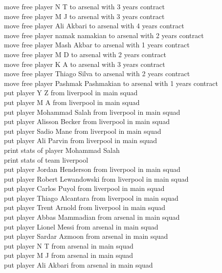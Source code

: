 \documentclass[]{article}
\begin{document}
{move free player N T to arsenal with 3 years contract\\
move free player M J to arsenal with 3 years contract\\
move free player Ali Akbari to arsenal with 4 years contract\\
move free player namak namakian to arsenal with 2 years contract\\
move free player Mash Akbar to arsenal with 1 years contract\\
move free player M D to arsenal with 2 years contract\\
move free player K A to arsenal with 3 years contract\\
move free player Thiago Silva to arsenal with 2 years contract\\
move free player Pashmak Pashmakian to arsenal with 1 years contract\\
put player Y Z from liverpool in main squad\\
put player M A from liverpool in main squad\\
put player Mohammad Salah from liverpool in main squad\\
put player Alisson Becker from liverpool in main squad\\
put player Sadio Mane from liverpool in main squad\\
put player Ali Parvin from liverpool in main squad\\
print stats of player Mohammad Salah\\
print stats of team liverpool\\
put player Jordan Henderson from liverpool in main squad\\
put player Robert Lewandowski from liverpool in main squad\\
put player Carlos Puyol from liverpool in main squad\\
put player Thiago Alcantara from liverpool in main squad\\
put player Trent Arnold from liverpool in main squad\\
put player Abbas Mammadian from arsenal in main squad\\
put player Lionel Messi from arsenal in main squad\\
put player Sardar Azmoon from arsenal in main squad\\
put player N T from arsenal in main squad\\
put player M J from arsenal in main squad\\
put player Ali Akbari from arsenal in main squad\\
}
\end{document}
